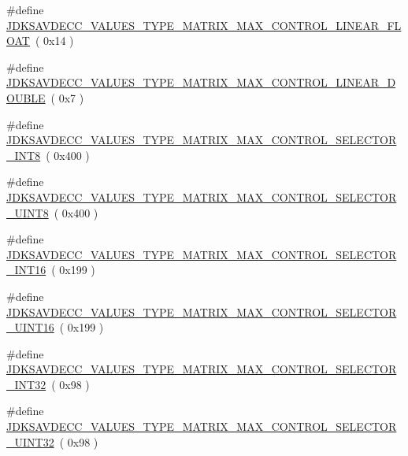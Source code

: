 \begin{DoxyCompactItemize}
\item 
\#define \hyperlink{group__values__type__matrix__max_ga3b139b2e6bcadde7c5af40aaf0757d97}{J\+D\+K\+S\+A\+V\+D\+E\+C\+C\+\_\+\+V\+A\+L\+U\+E\+S\+\_\+\+T\+Y\+P\+E\+\_\+\+M\+A\+T\+R\+I\+X\+\_\+\+M\+A\+X\+\_\+\+C\+O\+N\+T\+R\+O\+L\+\_\+\+L\+I\+N\+E\+A\+R\+\_\+\+F\+L\+O\+AT}~( 0x14 )
\item 
\#define \hyperlink{group__values__type__matrix__max_ga830b0f8e503f71cc5b7a7bf13f0c8c60}{J\+D\+K\+S\+A\+V\+D\+E\+C\+C\+\_\+\+V\+A\+L\+U\+E\+S\+\_\+\+T\+Y\+P\+E\+\_\+\+M\+A\+T\+R\+I\+X\+\_\+\+M\+A\+X\+\_\+\+C\+O\+N\+T\+R\+O\+L\+\_\+\+L\+I\+N\+E\+A\+R\+\_\+\+D\+O\+U\+B\+LE}~( 0x7 )
\item 
\#define \hyperlink{group__values__type__matrix__max_gabb1f09ee1a669f7d3bb8e5e3883723ce}{J\+D\+K\+S\+A\+V\+D\+E\+C\+C\+\_\+\+V\+A\+L\+U\+E\+S\+\_\+\+T\+Y\+P\+E\+\_\+\+M\+A\+T\+R\+I\+X\+\_\+\+M\+A\+X\+\_\+\+C\+O\+N\+T\+R\+O\+L\+\_\+\+S\+E\+L\+E\+C\+T\+O\+R\+\_\+\+I\+N\+T8}~( 0x400 )
\item 
\#define \hyperlink{group__values__type__matrix__max_gad615a5ee0eb27881031f863b4b79119e}{J\+D\+K\+S\+A\+V\+D\+E\+C\+C\+\_\+\+V\+A\+L\+U\+E\+S\+\_\+\+T\+Y\+P\+E\+\_\+\+M\+A\+T\+R\+I\+X\+\_\+\+M\+A\+X\+\_\+\+C\+O\+N\+T\+R\+O\+L\+\_\+\+S\+E\+L\+E\+C\+T\+O\+R\+\_\+\+U\+I\+N\+T8}~( 0x400 )
\item 
\#define \hyperlink{group__values__type__matrix__max_ga779ee14fffa59c27da95a653d7f555c0}{J\+D\+K\+S\+A\+V\+D\+E\+C\+C\+\_\+\+V\+A\+L\+U\+E\+S\+\_\+\+T\+Y\+P\+E\+\_\+\+M\+A\+T\+R\+I\+X\+\_\+\+M\+A\+X\+\_\+\+C\+O\+N\+T\+R\+O\+L\+\_\+\+S\+E\+L\+E\+C\+T\+O\+R\+\_\+\+I\+N\+T16}~( 0x199 )
\item 
\#define \hyperlink{group__values__type__matrix__max_ga1660e19d0e8818d0c40a4a81cc3778b2}{J\+D\+K\+S\+A\+V\+D\+E\+C\+C\+\_\+\+V\+A\+L\+U\+E\+S\+\_\+\+T\+Y\+P\+E\+\_\+\+M\+A\+T\+R\+I\+X\+\_\+\+M\+A\+X\+\_\+\+C\+O\+N\+T\+R\+O\+L\+\_\+\+S\+E\+L\+E\+C\+T\+O\+R\+\_\+\+U\+I\+N\+T16}~( 0x199 )
\item 
\#define \hyperlink{group__values__type__matrix__max_ga9f870e809fe134ad24ca7be535b33276}{J\+D\+K\+S\+A\+V\+D\+E\+C\+C\+\_\+\+V\+A\+L\+U\+E\+S\+\_\+\+T\+Y\+P\+E\+\_\+\+M\+A\+T\+R\+I\+X\+\_\+\+M\+A\+X\+\_\+\+C\+O\+N\+T\+R\+O\+L\+\_\+\+S\+E\+L\+E\+C\+T\+O\+R\+\_\+\+I\+N\+T32}~( 0x98 )
\item 
\#define \hyperlink{group__values__type__matrix__max_gab8284dc5fcb60d27b01b16b188b7fafa}{J\+D\+K\+S\+A\+V\+D\+E\+C\+C\+\_\+\+V\+A\+L\+U\+E\+S\+\_\+\+T\+Y\+P\+E\+\_\+\+M\+A\+T\+R\+I\+X\+\_\+\+M\+A\+X\+\_\+\+C\+O\+N\+T\+R\+O\+L\+\_\+\+S\+E\+L\+E\+C\+T\+O\+R\+\_\+\+U\+I\+N\+T32}~( 0x98 )

\end{DoxyCompactItemize}
